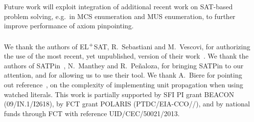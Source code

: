 \documentclass{llncs}
\newcommand{\tn}{\textnormal}
\newcommand{\elsat}{EL$^{\tn{+}}$SAT\xspace}
\begin{document}
Future work will exploit integration of additional recent work on
SAT-based problem solving, e.g.\ in MCS enumeration and MUS
enumeration, to further improve performance of axiom pinpointing. 


\subsubsection*{\ackname}
We thank the authors of \elsat, R.\ Sebastiani and M.\ Vescovi, for
authorizing the use of the most recent, yet unpublished, version of
their work~\cite{sebastiani-tr15}.
We thank the authors of SATPin~\cite{mp-tr15}, N.\ Manthey and
R.\ Pe\~{n}aloza, for bringing SATPin to our attention, and for
allowing us to use their tool.
We thank A.\ Biere for pointing out reference~\cite{gent-jair13}, on
the complexity of implementing unit propagation when using watched
literals.
This work is partially supported by SFI PI grant BEACON (09/IN.1/\-I2618),
by FCT grant POLARIS (PTDC/EIA-CCO//), and by national funds
through FCT with reference UID/CEC/50021/2013.

\clearpage
\end{document}
